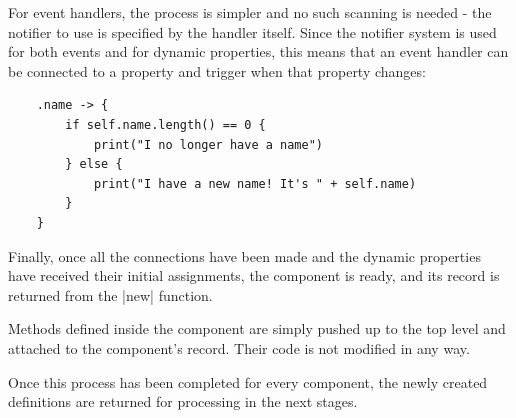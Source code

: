 \documentclass[11pt]{report}
\begin{document}
For event handlers, the process is simpler and no such scanning is needed - the notifier to use is specified by the handler itself. Since the notifier system is used for both events and for dynamic properties, this means that an event handler can be connected to a property and trigger when that property changes:

\begin{Verbatim}
    .name -> {
        if self.name.length() == 0 {
            print("I no longer have a name")
        } else {
            print("I have a new name! It's " + self.name)
        }
    }
\end{Verbatim}

Finally, once all the connections have been made and the dynamic properties have received their initial assignments, the component is ready, and its record is returned from the |new| function.

Methods defined inside the component are simply pushed up to the top level and attached to the component's record. Their code is not modified in any way.

Once this process has been completed for every component, the newly created definitions are returned for processing in the next stages.
\end{document}
